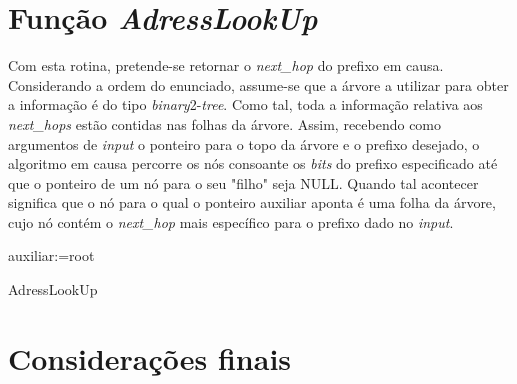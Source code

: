 \documentclass[a4paper]{article}
\begin{document}
\section{Função \textit{AdressLookUp}}
Com esta rotina, pretende-se retornar o \textit{next\_hop} do prefixo em causa. Considerando a ordem do enunciado, assume-se que a árvore a utilizar para obter a informação é do tipo \textit{binary}2-\textit{tree}. Como tal, toda a informação relativa aos \textit{next\_hops} estão contidas nas folhas da árvore. Assim, recebendo como argumentos de \textit{input} o ponteiro para o topo da árvore e o prefixo desejado, o algoritmo em causa percorre os nós consoante os \textit{bits} do prefixo especificado até que o ponteiro de um nó para o seu "filho" seja NULL. Quando tal acontecer significa que o nó para o qual o ponteiro auxiliar aponta é uma folha da árvore, cujo nó contém o \textit{next\_hop} mais específico para o prefixo dado no \textit{input}.

\begin{algorithm}[H]
 auxiliar:=root\;
 
 \;
 \caption{AdressLookUp}
\end{algorithm}
\section{Considerações finais}
\end{document}

